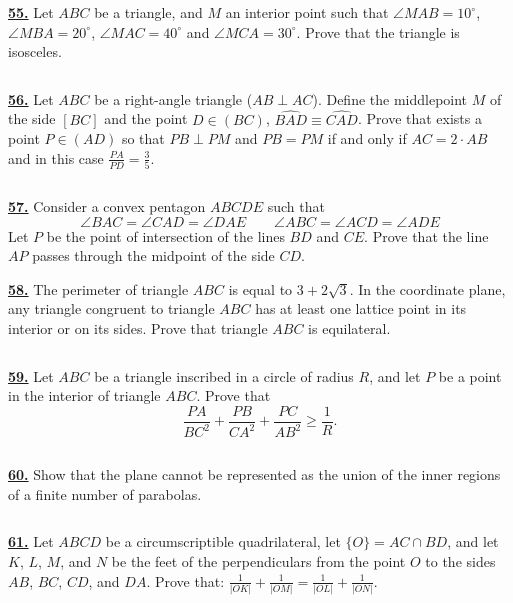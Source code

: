 \documentclass{article}
\begin{document}
$$ $$

\href{ http://www.artofproblemsolving.com/Forum/viewtopic.php?p=2#p2
}{\bf 55.} Let $ABC$ be a triangle, and $M$ an interior point such that $\angle MAB=10^\circ$, $\angle MBA=20^\circ$, $\angle MAC=40^\circ$ and $\angle MCA=30^\circ$. Prove that the triangle is isosceles.


$$ $$

\href{http://www.artofproblemsolving.com/Forum/viewtopic.php?p=448458#p448458
 }{\bf 56.} Let $ABC$ be a right-angle triangle ($AB\perp AC$). Define the middlepoint $M$ of the side $[BC]$ and the point $D\in (BC)$, $\widehat {BAD}\equiv\widehat {CAD}$. Prove that exists a point $P\in (AD)$ so that $PB\perp PM$ and $PB=PM$ if and only if $AC=2\cdot AB$ and in this case $\frac{PA}{PD}=\frac 35$.


$$ $$

\href{ http://www.artofproblemsolving.com/Forum/viewtopic.php?p=741369#p741369
}{\bf 57.} Consider a convex pentagon $ ABCDE$ such that
$$ \angle BAC = \angle CAD = \angle DAE \quad \quad  \angle ABC = \angle ACD = \angle ADE
$$
Let $ P$ be the point of intersection of the lines $ BD$ and $ CE$. Prove that the line $ AP$ passes through the midpoint of the side $ CD$.


\href{ http://www.artofproblemsolving.com/Forum/viewtopic.php?p=2111860#p2111860
}{\bf 58.} The perimeter of triangle $ABC$ is equal to $3+2\sqrt3$. In the coordinate plane, any triangle congruent to triangle $ABC$ has at least one lattice point in its interior or on its sides. Prove that triangle $ABC$ is equilateral.


$$ $$

\href{ http://www.artofproblemsolving.com/Forum/viewtopic.php?p=20670#p20670
}{\bf 59.} Let $ ABC$ be a triangle inscribed in a circle of radius $ R$, and let $ P$ be a point in the interior of triangle $ ABC$. Prove that
$$ \frac {PA}{BC^{2}} + \frac {PB}{CA^{2}} + \frac {PC}{AB^{2}}\ge \frac {1}{R}.
$$


$$ $$

\href{http://www.artofproblemsolving.com/Forum/viewtopic.php?p=794452#p794452
 }{\bf 60.} Show that the plane cannot be represented as the union of the inner regions of a finite number of parabolas.

$$ $$


\href{ http://www.artofproblemsolving.com/Forum/viewtopic.php?p=960160#p960160
}{\bf 61.} Let $ ABCD$ be a circumscriptible quadrilateral, let $ \{O\} = AC \cap BD$, and let $ K$, $ L$, $ M$, and $ N$ be the feet of the perpendiculars from the point $ O$ to the sides $ AB$, $ BC$, $ CD$, and $ DA$. Prove that: $ \frac {1}{\left|OK\right|} + \frac {1}{\left|OM\right|} = \frac {1}{\left|OL\right|} + \frac {1}{\left|ON\right|}$.
\end{document}
